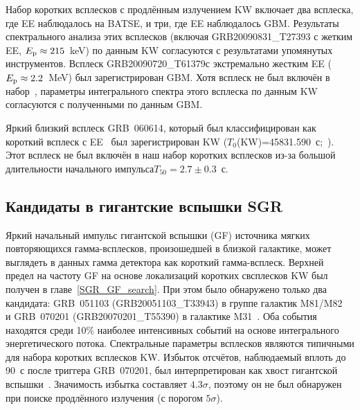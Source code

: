 Набор коротких всплесков с продлённым излучением KW включает два всплеска, 
где EE наблюдалось на BATSE, и три, где EE наблюдалось GBM. 
Результаты спектрального анализа этих всплесков (включая GRB20090831\_T27393 с жетким EE, 
$E_{\mathrm{p}} \approx 215$~keV) по данным KW согласуются с результатами упомянутых инструментов.
Всплеск GRB20090720\_T61379с экстремально жестким EE ($E_{\mathrm{p}} \approx 2.2$~MeV) 
был зарегистрирован GBM. Хотя всплеск не был включён в набор~\citep{Kaneko_2015MNRAS},
параметры интегрального спектра этого всплеска по данным KW согласуются с полученными 
по данным GBM.
 
Яркий близкий всплеск GRB~060614, который был классифицирован как короткий 
всплеск с EE~\citep{Gehrels_2006Nature} был зарегистрирован KW ($T_0$(KW)=45831.590~с;~\citep{Golenetskii_GCN5264}).
Этот всплеск не был включён в наш набор коротких всплесков из-за большой 
длительности начального импульса$T_{50}=2.7 \pm 0.3$~с.

\subsection{Кандидаты в гигантские вспышки SGR}
Яркий начальный импульс гигантской вспышки (GF) источника мягких повторяющихся гамма-всплесков, 
произошедшей в близкой галактике, может выглядеть в данных гамма детектора как короткий гамма-всплеск. 
Верхней предел на частоту GF на основе локализаций коротких свсплесков KW был
получен в главе~\ref{SGR_GF_search}. При этом было обнаружено только два кандидата:
GRB~051103 (GRB20051103\_T33943) в группе галактик M81/M82~\citep{Frederiks_2007AstLett} и 
GRB~070201 (GRB20070201\_T55390) в галактике M31~\citep{Mazets_2008ApJ}.
Оба события находятся среди 10\% наиболее интенсивных событий на основе интегрального 
энергетического потока. Спектральные параметры всплесков являются типичными для 
набора коротких всплесков KW.
Избыток отсчётов, наблюдаемый вплоть до 90~с после триггера GRB~070201, 
был интерпретирован как хвост гигантской вспышки~\citep{Mazets_2008ApJ}.
Значимость избытка составляет $4.3\sigma$, поэтому он не был обнаружен при 
поиске продлённого излучения (с порогом $5\sigma$).

